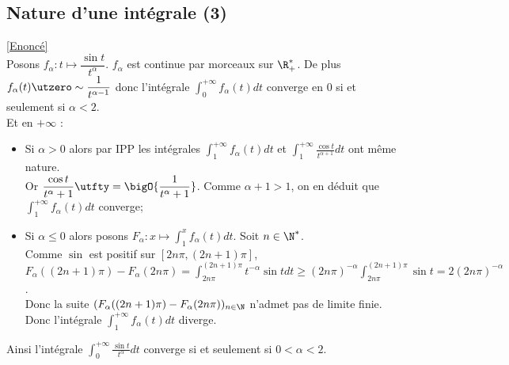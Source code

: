 \documentclass{book}
\begin{document}
	\subsection{Nature d'une intégrale (3) }
	\label{Nature d'une intégrale (3) corrigé}
	\textcolor{blue}{\hyperref[Nature d'une intégrale (3)]{[Enoncé]}}\\
	Posons $f_\alpha:t\mapsto \dfrac{\sin t}{t^\alpha}$. $f_\alpha$ est continue par morceaux sur $\R^*_+$. De plus $f_\alpha(t)\utzero\sim\dfrac{1}{t^{\alpha-1}}$ donc l'intégrale $\displaystyle\int_0^{+\infty}f_\alpha(t)dt$ converge en $0$ si et seulement si $\alpha<2$.\\
	Et en $+\infty$ :
	\begin{itemize}
		\item Si $\alpha>0$ alors par IPP les intégrales $\displaystyle\int_1^{+\infty}f_\alpha(t)dt$ et $\displaystyle\int_1^{+\infty}\frac{\cos t}{t^{\alpha+1}}dt$ ont même nature.\\
		Or $\dfrac{\cos t}{t^\alpha+1}\utfty=\bigO{\dfrac{1}{t^\alpha+1}}$. Comme $\alpha+1>1$, on en déduit que $\displaystyle\int_1^{+\infty}f_\alpha(t)dt$ converge;
		\item Si $\alpha\leq 0$ alors posons $F_\alpha:x\mapsto \displaystyle\int_1^xf_\alpha(t)dt$. Soit $n\in \N^*$.\\
		Comme $\sin$ est positif sur $[2n\pi,(2n+1)\pi]$,\\
		$F_\alpha((2n+1)\pi)-F_\alpha(2n\pi)=\displaystyle\int_{2n\pi}^{(2n+1)\pi}t^{-\alpha}\sin tdt\geq (2n\pi)^{-\alpha}\int_{2n\pi}^{(2n+1)\pi}\sin t=2(2n\pi)^{-\alpha}$.\\
		Donc la suite $(F_\alpha((2n+1)\pi)-F_\alpha(2n\pi))_{n\in \N}$ n'admet pas de limite finie. Donc l'intégrale $\displaystyle\int_1^{+\infty}f_\alpha(t)dt$ diverge.
	\end{itemize}
	Ainsi l'intégrale $\displaystyle\int_0^{+\infty}\frac{\sin t}{t^\alpha}dt$ converge si et seulement si $0<\alpha<2$.
	
\end{document}
